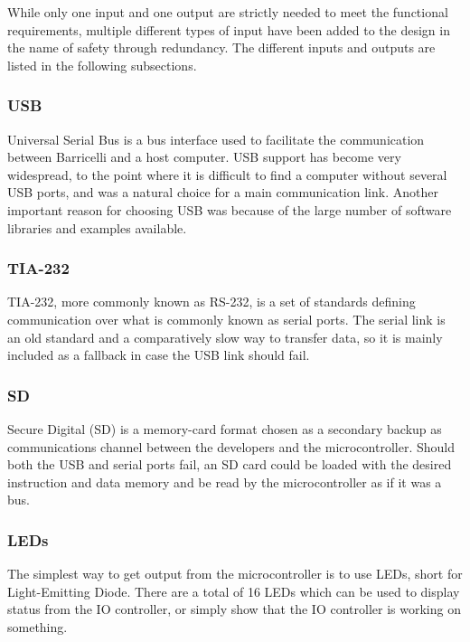 While only one input and one output are strictly needed to meet the functional requirements, multiple different types of input have been added to the design in the name of safety through redundancy.
The different inputs and outputs are listed in the following subsections.

\subsubsection{USB}

Universal Serial Bus is a bus interface used to facilitate the communication between Barricelli and a host computer.
USB support has become very widespread, to the point where it is difficult to find a computer without several USB ports, and was a natural choice for a main communication link.
Another important reason for choosing USB was because of the large number of software libraries and examples available.

\subsubsection{TIA-232}

TIA-232, more commonly known as RS-232, is a set of standards defining communication over what is commonly known as serial ports.
The serial link is an old standard and a comparatively slow way to transfer data, so it is mainly included as a fallback in case the USB link should fail.

\subsubsection{SD}

Secure Digital (SD) is a memory-card format chosen as a secondary backup as communications channel between the developers and the microcontroller.
Should both the USB and serial ports fail, an SD card could be loaded with the desired instruction and data memory and be read by the microcontroller as if it was a bus.

\subsubsection{LEDs}

The simplest way to get output from the microcontroller is to use LEDs, short for Light-Emitting Diode.
There are a total of 16 LEDs which can be used to display status from the IO controller, or simply show that the IO controller is working on something.

